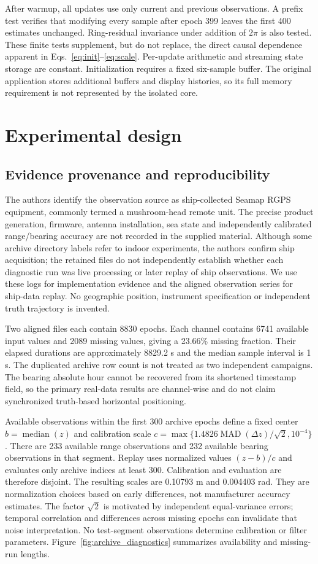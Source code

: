 \documentclass[12pt,a4paper]{article}
\newcommand{\MAD}{\operatorname{MAD}}
\newcommand{\med}{\operatorname{median}}
\begin{document}
After warmup, all updates use only current and previous observations. A prefix test verifies that modifying every sample after epoch 399 leaves the first 400 estimates unchanged. Ring-residual invariance under addition of $2\pi$ is also tested. These finite tests supplement, but do not replace, the direct causal dependence apparent in Eqs.~\eqref{eq:init}--\eqref{eq:scale}. Per-update arithmetic and streaming state storage are constant. Initialization requires a fixed six-sample buffer. The original application stores additional buffers and display histories, so its full memory requirement is not represented by the isolated core.

\section{Experimental design}
\subsection{Evidence provenance and reproducibility}
The authors identify the observation source as ship-collected Seamap RGPS equipment, commonly termed a mushroom-head remote unit. The precise product generation, firmware, antenna installation, sea state and independently calibrated range/bearing accuracy are not recorded in the supplied material. Although some archive directory labels refer to indoor experiments, the authors confirm ship acquisition; the retained files do not independently establish whether each diagnostic run was live processing or later replay of ship observations. We use these logs for implementation evidence and the aligned observation series for ship-data replay. No geographic position, instrument specification or independent truth trajectory is invented.

Two aligned files each contain 8830 epochs. Each channel contains 6741 available input values and 2089 missing values, giving a 23.66\% missing fraction. Their elapsed durations are approximately 8829.2 s and the median sample interval is 1 s. The duplicated archive row count is not treated as two independent campaigns. The bearing absolute hour cannot be recovered from its shortened timestamp field, so the primary real-data results are channel-wise and do not claim synchronized truth-based horizontal positioning.

Available observations within the first 300 archive epochs define a fixed center $b=\med(z)$ and calibration scale $c=\max\{1.4826\MAD(\Delta z)/\sqrt{2},10^{-4}\}$. There are 233 available range observations and 232 available bearing observations in that segment. Replay uses normalized values $(z-b)/c$ and evaluates only archive indices at least 300. Calibration and evaluation are therefore disjoint. The resulting scales are 0.10793 m and 0.004403 rad. They are normalization choices based on early differences, not manufacturer accuracy estimates. The factor $\sqrt{2}$ is motivated by independent equal-variance errors; temporal correlation and differences across missing epochs can invalidate that noise interpretation. No test-segment observations determine calibration or filter parameters. Figure~\ref{fig:archive_diagnostics} summarizes availability and missing-run lengths.
\end{document}
